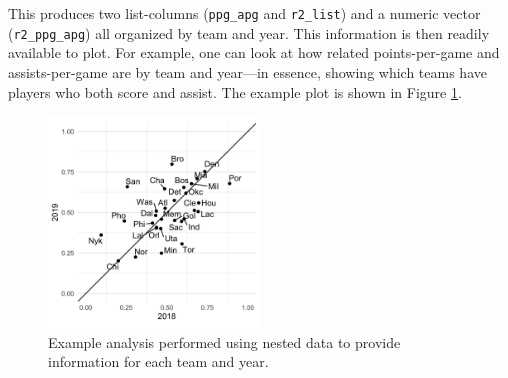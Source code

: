 \documentclass[doc,floatsintext]{apa6}
\newenvironment{Shaded}{\begin{snugshade}}{\end{snugshade}}
\newcommand{\DataTypeTok}[1]{\textcolor[rgb]{0.13,0.29,0.53}{#1}}
\newcommand{\DecValTok}[1]{\textcolor[rgb]{0.00,0.00,0.81}{#1}}
\newcommand{\KeywordTok}[1]{\textcolor[rgb]{0.13,0.29,0.53}{\textbf{#1}}}
\newcommand{\NormalTok}[1]{#1}
\newcommand{\OperatorTok}[1]{\textcolor[rgb]{0.81,0.36,0.00}{\textbf{#1}}}
\newcommand{\StringTok}[1]{\textcolor[rgb]{0.31,0.60,0.02}{#1}}
\begin{document}
\noindent This produces two list-columns (\texttt{ppg\_apg} and \texttt{r2\_list}) and a numeric vector (\texttt{r2\_ppg\_apg}) all organized by team and year. This information is then readily available to plot. For example, one can look at how related points-per-game and assists-per-game are by team and year---in essence, showing which teams have players who both score and assist. The example plot is shown in Figure \ref{exfig}.

\begin{Shaded}
\end{Shaded}

\begin{figure}[tb]
  \centering
  \includegraphics[width=0.5\textwidth]{ex_fig.png}
  \caption{Example analysis performed using nested data to provide information for each team and year.}
  \label{exfig}
\end{figure}
\end{document}
